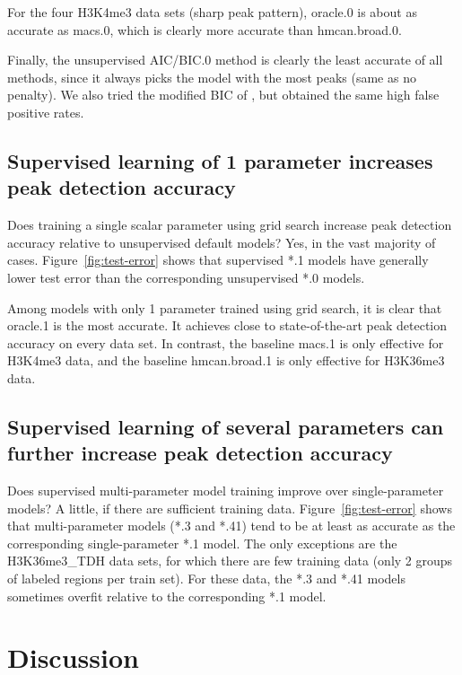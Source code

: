 \documentclass{article}
\begin{document}
For the four H3K4me3 data sets (sharp peak pattern), oracle.0 is about
as accurate as macs.0, which is clearly more accurate than
hmcan.broad.0.

Finally, the unsupervised AIC/BIC.0 method is clearly the least
accurate of all methods, since it always picks the model with the most
peaks (same as no penalty). We also tried the modified BIC of
\citet{mBIC}, but obtained the same high false positive rates.

\subsection{Supervised learning of 1 parameter increases peak
  detection accuracy}

Does training a single scalar parameter using grid search increase
peak detection accuracy relative to unsupervised default models? Yes,
in the vast majority of cases. Figure~\ref{fig:test-error} shows that
supervised *.1 models have generally lower test error than the
corresponding unsupervised *.0 models.

Among models with only 1 parameter trained using grid search, it is
clear that oracle.1 is the most accurate. It achieves close to
state-of-the-art peak detection accuracy on every data set. In
contrast, the baseline macs.1 is only effective for H3K4me3 data, and
the baseline \mbox{hmcan.broad.1} is only effective for H3K36me3 data.

\subsection{Supervised learning of several parameters can further
  increase peak detection accuracy}

Does supervised multi-parameter model training improve over
single-parameter models? A little, if there are sufficient training
data. Figure~\ref{fig:test-error} shows that multi-parameter models
(*.3 and *.41) tend to be at least as accurate as the corresponding
single-parameter *.1 model. The only exceptions are the H3K36me3\_TDH
data sets, for which there are few training data (only 2 groups of
labeled regions per train set). For these data, the *.3 and
*.41 models sometimes overfit relative to the corresponding *.1 model.

\section{Discussion}
\label{sec:discussion}
\end{document}
